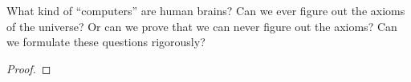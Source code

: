\begin{question}
  What kind of ``computers'' are human brains? Can we ever figure out
  the axioms of the universe? Or can we prove that we can never figure
  out the axioms? Can we formulate these questions rigorously?
\end{question}
\begin{proof}
\end{proof}
